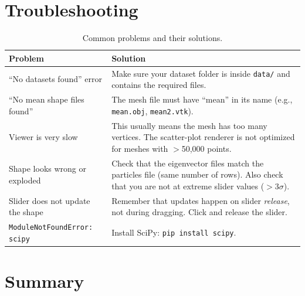 \documentclass[12pt,a4paper]{article}
\begin{document}
\section{Troubleshooting}

\begin{table}[H]
\centering
\renewcommand{\arraystretch}{1.5}
\begin{tabular}{@{}p{5cm}p{9cm}@{}}
\toprule
\textbf{Problem} & \textbf{Solution} \\
\midrule
``No datasets found'' error & Make sure your dataset folder is inside \texttt{data/} and contains the required files. \\
``No mean shape files found'' & The mesh file must have ``mean'' in its name (e.g., \texttt{mean.obj}, \texttt{mean2.vtk}). \\
Viewer is very slow & This usually means the mesh has too many vertices. The scatter-plot renderer is not optimized for meshes with $>$50,000 points. \\
Shape looks wrong or exploded & Check that the eigenvector files match the particles file (same number of rows). Also check that you are not at extreme slider values ($>$3$\sigma$). \\
Slider does not update the shape & Remember that updates happen on slider \emph{release}, not during dragging. Click and release the slider. \\
\texttt{ModuleNotFoundError: scipy} & Install SciPy: \texttt{pip install scipy}. \\
\bottomrule
\end{tabular}
\caption{Common problems and their solutions.}
\label{tab:troubleshooting}
\end{table}

\section{Summary}
\end{document}
